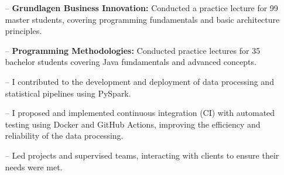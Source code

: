 



\begin{itemize}
    \setlength{\itemindent}{0.5em}
    \item[--]  \textbf{Grundlagen Business Innovation:} Conducted a practice lecture for 99 master students, covering programming fundamentals and basic architecture principles.
    \item[--]  \textbf{Programming Methodologies:} Conducted practice lectures for 35 bachelor students covering Java fundamentals and advanced concepts.
\end{itemize}

\medskip



\begin{itemize}
    \setlength{\itemindent}{0.5em}
    \item[--]  I contributed to the development and deployment of data processing and statistical pipelines using PySpark. 
    \item[--]  I proposed and implemented continuous integration (CI) with automated testing using Docker and GitHub Actions, improving the efficiency and reliability of the data processing. 
\end{itemize}

\medskip

\newpage


\begin{itemize}
    \setlength{\itemindent}{0.5em}
    \item[--] Led projects and supervised teams, interacting with clients to ensure their needs were met.
\end{itemize}

\medskip



